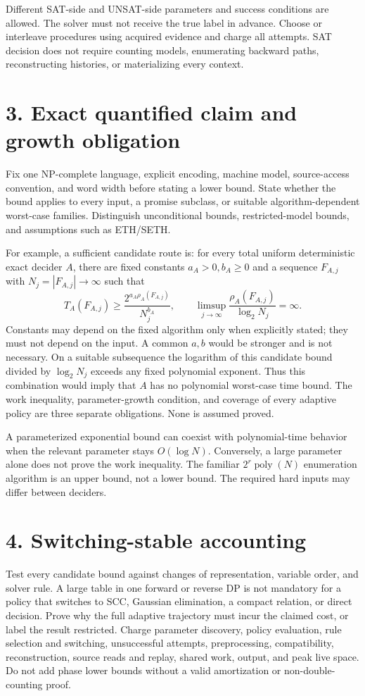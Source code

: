 \documentclass[11pt]{article}
\begin{document}
Different SAT-side and UNSAT-side parameters and success conditions are allowed. The solver must not receive the true label in advance. Choose or interleave procedures using acquired evidence and charge all attempts. SAT decision does not require counting models, enumerating backward paths, reconstructing histories, or materializing every context.

\section*{3. Exact quantified claim and growth obligation}
Fix one NP-complete language, explicit encoding, machine model, source-access convention, and word width before stating a lower bound. State whether the bound applies to every input, a promise subclass, or suitable algorithm-dependent worst-case families. Distinguish unconditional bounds, restricted-model bounds, and assumptions such as ETH/SETH.

For example, a sufficient candidate route is: for every total uniform deterministic exact decider $A$, there are fixed constants $a_A>0,b_A\ge0$ and a sequence $F_{A,j}$ with $N_j=|F_{A,j}|\to\infty$ such that
\[
T_A(F_{A,j})\ge\frac{2^{a_A\rho_A(F_{A,j})}}{N_j^{b_A}},
\qquad
\limsup_{j\to\infty}\frac{\rho_A(F_{A,j})}{\log_2N_j}=\infty.
\]
Constants may depend on the fixed algorithm only when explicitly stated; they must not depend on the input. A common $a,b$ would be stronger and is not necessary. On a suitable subsequence the logarithm of this candidate bound divided by $\log_2N_j$ exceeds any fixed polynomial exponent. Thus this combination would imply that $A$ has no polynomial worst-case time bound. The work inequality, parameter-growth condition, and coverage of every adaptive policy are three separate obligations. None is assumed proved.

A parameterized exponential bound can coexist with polynomial-time behavior when the relevant parameter stays $O(\log N)$. Conversely, a large parameter alone does not prove the work inequality. The familiar $2^r\operatorname{poly}(N)$ enumeration algorithm is an upper bound, not a lower bound. The required hard inputs may differ between deciders.

\section*{4. Switching-stable accounting}
Test every candidate bound against changes of representation, variable order, and solver rule. A large table in one forward or reverse DP is not mandatory for a policy that switches to SCC, Gaussian elimination, a compact relation, or direct decision. Prove why the full adaptive trajectory must incur the claimed cost, or label the result restricted. Charge parameter discovery, policy evaluation, rule selection and switching, unsuccessful attempts, preprocessing, compatibility, reconstruction, source reads and replay, shared work, output, and peak live space. Do not add phase lower bounds without a valid amortization or non-double-counting proof.
\end{document}
